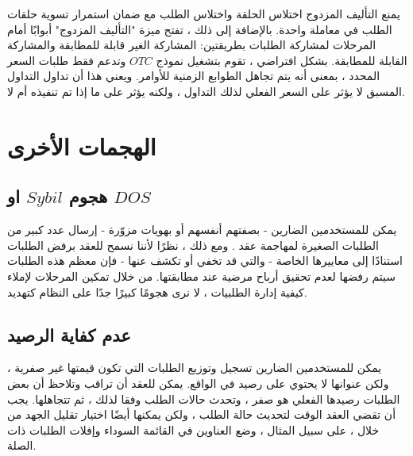 \documentclass[12pt, a4paper, leqno]{report}
\theoremstyle{plain}
\theoremstyle{definition}
\begin{document}
\begin{multicols}{2}
\begin{otherlanguage}{arabic}
يمنع التأليف المزدوج اختلاس الحلقة  واختلاس الطلب مع ضمان استمرار تسوية حلقات الطلب في معاملة واحدة. بالإضافة إلى ذلك ، تفتح ميزة "التأليف المزدوج" أبوابًا أمام المرحلات لمشاركة الطلبات بطريقتين: المشاركة الغير قابلة للمطابقة والمشاركة القابلة للمطابقة. بشكل افتراضي ، تقوم  بتشغيل نموذج $OTC$ وتدعم فقط طلبات السعر المحدد ، بمعنى أنه يتم تجاهل الطوابع الزمنية للأوامر. ويعني هذا أن تداول التداول المسبق لا يؤثر على السعر الفعلي لذلك التداول ، ولكنه يؤثر على ما إذا تم تنفيذه أم لا.
\end{otherlanguage}
\end{multicols}

\chapter{الهجمات الأخرى}
\begin{multicols}{2}
\section{هجوم $Sybil$ او $DOS$}
\begin{otherlanguage}{arabic}
يمكن للمستخدمين الضارين - بصفتهم أنفسهم أو بهويات مزوّرة - إرسال عدد كبير من الطلبات الصغيرة لمهاجمة عقد  . ومع ذلك ، نظرًا لأننا نسمح للعقد برفض الطلبات استنادًا إلى معاييرها الخاصة - والتي قد تخفي أو تكشف عنها - فإن معظم هذه الطلبات سيتم رفضها لعدم تحقيق أرباح مرضية عند مطابقتها. من خلال تمكين المرحلات لإملاء كيفية إدارة الطلبيات ، لا نرى هجومًا كبيرًا جدًا على النظام كتهديد.
\end{otherlanguage}
\section{عدم كفاية الرصيد}
\begin{otherlanguage}{arabic}
يمكن للمستخدمين الضارين تسجيل وتوزيع الطلبات التي تكون قيمتها غير صفرية ، ولكن عنوانها لا يحتوي على رصيد في الواقع. يمكن للعقد أن تراقب وتلاحظ أن بعض الطلبات رصيدها الفعلي هو صفر ، وتحدث حالات الطلب وفقا لذلك ، ثم تتجاهلها. يجب أن تقضي العقد الوقت لتحديث حالة الطلب ، ولكن يمكنها أيضًا اختيار تقليل الجهد من خلال ، على سبيل المثال ، وضع العناوين في القائمة السوداء وإفلات الطلبات ذات الصلة.
\end{otherlanguage}
\end{multicols}

\end{document}
